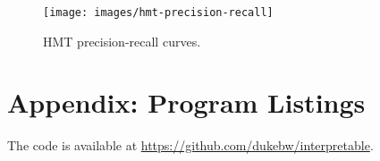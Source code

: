 \documentclass{article}
\begin{document}
\begin{figure}[t]
	\texttt{[image: images/hmt-precision-recall]}
	\caption{\label{fig:hmt-precision-recall}HMT precision-recall curves.}
\end{figure}

\clearpage
\appendix
\section{Appendix: Program Listings}

The code is available at \url{https://github.com/dukebw/interpretable}.

\small


\end{document}

